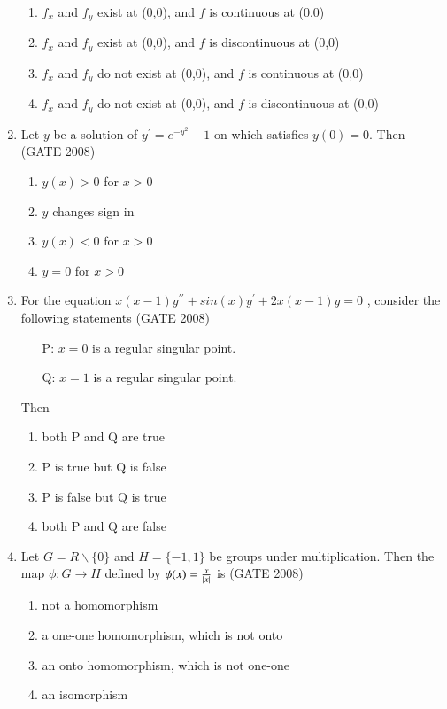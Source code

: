 \documentclass[journal]{IEEEtran}
\begin{document}
\begin{enumerate}
{\begin{enumerate}
    \item $f_x$ and $f_y$ exist at (0,0), and $f$ is continuous at (0,0) 
    \item $f_x$ and $f_y$ exist at (0,0), and $f$ is discontinuous at (0,0)
    \item $f_x$ and $f_y$ do not exist at (0,0), and $f$ is continuous at (0,0)
    \item $f_x$ and $f_y$ do not exist at (0,0), and $f$ is discontinuous at (0,0)
\end{enumerate}
}

\item { Let $y$ be a solution of $y^\prime=e^{-y^2}-1$ on  which satisfies $y(0) = 0$. Then \hfill (GATE 2008)
\begin{multicols}{2}
\begin{enumerate}
    \item $y(x)>0$ for $x>0$
    \item $y$ changes sign in 
    \item $y(x) <0$ for $x>0 $
    \item $y=0$ for $x>0$
\end{enumerate}
\end{multicols}
}

\item{ For the equation $x(x-1)y^{\prime\prime}+sin(x)y^\prime+2x(x-1)y=0$ , consider the following statements  \hfill (GATE 2008)
    \begin{itemize}
        \item[P:] $x=0$ is a regular singular point. 
        \item[Q:] $x=1$ is a regular singular point.
    \end{itemize}
    
Then
\begin{multicols}{2}
\begin{enumerate}
    \item both P and Q are true
    \item P is true but Q is false
    \item P is false but Q is true
    \item both P and Q are false
\end{enumerate}
\end{multicols}
}

\item{ Let $G = R \backslash \{0\}$ and $H=\{-1, 1\}$ be groups under multiplication. Then the map $\phi: G \rightarrow H$ defined by $\phi(x) = \frac{x}{\left\vert x\right\vert}$ is \hfill (GATE 2008)
\begin{enumerate}
    \item not a homomorphism
    \item a one-one homomorphism, which is not onto 
    \item an onto homomorphism, which is not one-one 
    \item an isomorphism
\end{enumerate}
}




\end{enumerate}
\end{document}
